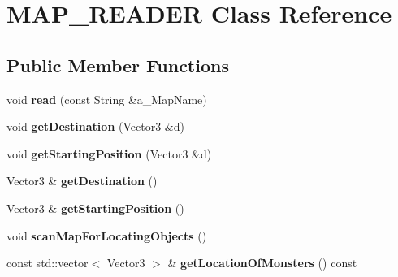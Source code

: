 \hypertarget{class_m_a_p___r_e_a_d_e_r}{
\section{MAP\_\-READER Class Reference}
\label{class_m_a_p___r_e_a_d_e_r}
}
\subsection*{Public Member Functions}
\begin{DoxyCompactItemize}
\item 
\hypertarget{class_m_a_p___r_e_a_d_e_r_aa0fa5be16dd16735050fce6ae9bc546c}{
void {\bfseries read} (const String \&a\_\-MapName)}
\label{class_m_a_p___r_e_a_d_e_r_aa0fa5be16dd16735050fce6ae9bc546c}

\item 
\hypertarget{class_m_a_p___r_e_a_d_e_r_a57eb385757f5793bfd5af21af9ab338d}{
void {\bfseries getDestination} (Vector3 \&d)}
\label{class_m_a_p___r_e_a_d_e_r_a57eb385757f5793bfd5af21af9ab338d}

\item 
\hypertarget{class_m_a_p___r_e_a_d_e_r_a7ffe7cc40124dec1e043f97938c78b52}{
void {\bfseries getStartingPosition} (Vector3 \&d)}
\label{class_m_a_p___r_e_a_d_e_r_a7ffe7cc40124dec1e043f97938c78b52}

\item 
\hypertarget{class_m_a_p___r_e_a_d_e_r_a0e1fdb7aa938f15641ebd2cb7dfef9cd}{
Vector3 \& {\bfseries getDestination} ()}
\label{class_m_a_p___r_e_a_d_e_r_a0e1fdb7aa938f15641ebd2cb7dfef9cd}

\item 
\hypertarget{class_m_a_p___r_e_a_d_e_r_a3e304ca5391f5de52b101a8c2ecf5726}{
Vector3 \& {\bfseries getStartingPosition} ()}
\label{class_m_a_p___r_e_a_d_e_r_a3e304ca5391f5de52b101a8c2ecf5726}

\item 
\hypertarget{class_m_a_p___r_e_a_d_e_r_ab20b599db48c1057bced6b4005397e6c}{
void {\bfseries scanMapForLocatingObjects} ()}
\label{class_m_a_p___r_e_a_d_e_r_ab20b599db48c1057bced6b4005397e6c}

\item 
\hypertarget{class_m_a_p___r_e_a_d_e_r_a2a0b90046c1171e93d8122b10670d662}{
const std::vector$<$ Vector3 $>$ \& {\bfseries getLocationOfMonsters} () const }
\label{class_m_a_p___r_e_a_d_e_r_a2a0b90046c1171e93d8122b10670d662}

\end{DoxyCompactItemize}
